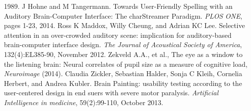 \documentclass[10pt]{article}
\begin{document}
\begin{spacing}{.865}
{\begin{thebibliography}{99}
        1989.
     J Hohne and M Tangermann. Towards
        User-Friendly Spelling with an Auditory Brain-Computer
        Interface: The charStreamer Paradigm. \emph{PLOS ONE},
        pages 1-23, 2014.
     Ross K Maddox, Willy Cheung, and
        Adrian KC Lee. Selective attention in an over-crowded
        auditory scene: implication for auditory-based
        brain-computer interface design. \emph{The Journal of
        Acoustical Society of America}, 132(4):EL385-90,
        November 2012.
     Zekveld A.A., et al., The eye as a
        window to the listening brain: Neural correlates of
        pupil size as a measure of cognitive load,
        \emph{Neuroimage} (2014).
     Claudia Zickler, Sebastian Halder,
        Sonja C Kleih, Cornelia Herbert, and Andrea Kubler.
        Brain Painting: usability testing according to the
        user-centered design in end suers with severe motor
        paralysis. \emph{Artificial Intelligence in medicine},
        59(2):99-110, October 2013.
\end{thebibliography}}

\end{spacing}
%
\end{document}
